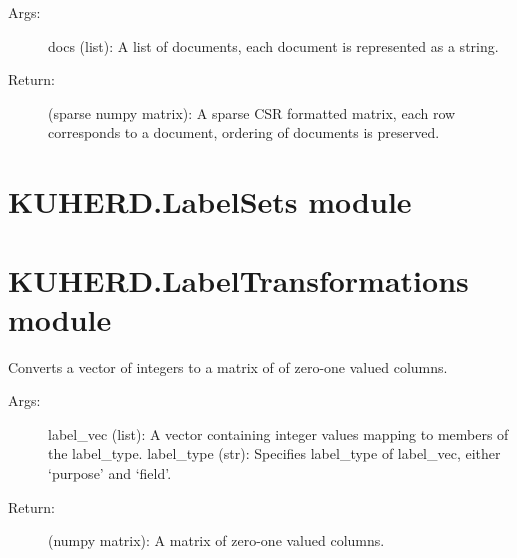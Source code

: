 \documentclass[letterpaper,10pt,english]{sphinxmanual}
\begin{document}
\begin{fulllineitems}
\begin{fulllineitems}
\begin{description}
\item[{Args:}] \leavevmode
docs (list): A list of documents, each document is represented as a string.

\item[{Return:}] \leavevmode
(sparse numpy matrix): A sparse CSR formatted matrix, each row corresponds to a document, ordering of documents is preserved.

\end{description}

\end{fulllineitems}


\end{fulllineitems}


\begin{fulllineitems}
\label{\detokenize{KUHERD:KUHERD.HerdVectorizer.main}}
\end{fulllineitems}



\section{KUHERD.LabelSets module}
\label{\detokenize{KUHERD:module-KUHERD.LabelSets}}\label{\detokenize{KUHERD:kuherd-labelsets-module}}

\section{KUHERD.LabelTransformations module}
\label{\detokenize{KUHERD:module-KUHERD.LabelTransformations}}\label{\detokenize{KUHERD:kuherd-labeltransformations-module}}

\begin{fulllineitems}
\label{\detokenize{KUHERD:KUHERD.LabelTransformations.label2mat}}
Converts a vector of integers to a matrix of of zero-one valued columns.
\begin{description}
\item[{Args:}] \leavevmode
label\_vec (list): A vector containing integer values mapping to members of the label\_type.
label\_type (str): Specifies label\_type of label\_vec, either `purpose' and `field'.

\item[{Return:}] \leavevmode
(numpy matrix): A matrix of zero-one valued columns.

\end{description}

\end{fulllineitems}
\end{document}
